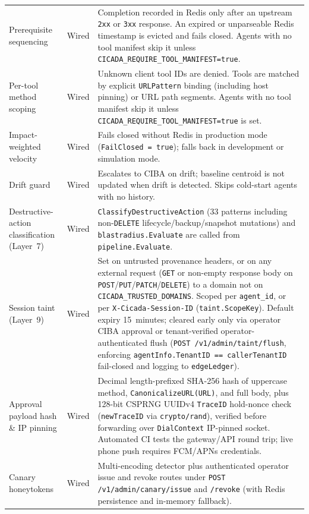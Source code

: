 \documentclass[11pt, a4paper]{article}
\begin{document}
\begin{small}
\begin{longtable}{@{} p{3.6cm} p{2.6cm} p{9.2cm} @{}}
\addlinespace
Prerequisite sequencing & Wired & Completion recorded in Redis only after an upstream \texttt{2xx} or \texttt{3xx} response. An expired or unparseable Redis timestamp is evicted and fails closed. Agents with no tool manifest skip it unless \texttt{CICADA\_REQUIRE\_TOOL\_MANIFEST=true}. \\
\addlinespace
Per-tool method scoping & Wired & Unknown client tool IDs are denied. Tools are matched by explicit \texttt{URLPattern} binding (including host pinning) or URL path segments. Agents with no tool manifest skip it unless \texttt{CICADA\_REQUIRE\_TOOL\_MANIFEST=true} is set. \\
\addlinespace
Impact-weighted velocity & Wired & Fails closed without Redis in production mode (\texttt{FailClosed = true}); falls back in development or simulation mode. \\
\addlinespace
Drift guard & Wired & Escalates to CIBA on drift; baseline centroid is not updated when drift is detected. Skips cold-start agents with no history. \\
\addlinespace
Destructive-action classification (Layer~7) & Wired & \texttt{ClassifyDestructiveAction} (33 patterns including non-\texttt{DELETE} lifecycle/backup/snapshot mutations) and \texttt{blastradius.Evaluate} are called from \texttt{pipeline.Evaluate}. \\
\addlinespace
Session taint (Layer~9) & Wired & Set on untrusted provenance headers, or on any external request (\texttt{GET} or non-empty response body on \texttt{POST}/\texttt{PUT}/\texttt{PATCH}/\texttt{DELETE}) to a domain not on \texttt{CICADA\_TRUSTED\_DOMAINS}. Scoped per \texttt{agent\_id}, or per \texttt{X-Cicada-Session-ID} (\texttt{taint.ScopeKey}). Default expiry 15~minutes; cleared early only via operator CIBA approval or tenant-verified operator-authenticated flush (\texttt{POST /v1/admin/taint/flush}, enforcing \texttt{agentInfo.TenantID == callerTenantID} fail-closed and logging to \texttt{edgeLedger}). \\
\addlinespace
Approval payload hash \& IP pinning & Wired & Decimal length-prefixed SHA-256 hash of uppercase method, \texttt{CanonicalizeURL(URL)}, and full body, plus 128-bit CSPRNG UUIDv4 \texttt{TraceID} hold-nonce check (\texttt{newTraceID} via \texttt{crypto/rand}), verified before forwarding over \texttt{DialContext} IP-pinned socket. Automated CI tests the gateway/API round trip; live phone push requires FCM/APNs credentials. \\
\addlinespace
Canary honeytokens & Wired & Multi-encoding detector plus authenticated operator issue and revoke routes under \texttt{POST /v1/admin/canary/issue} and \texttt{/revoke} (with Redis persistence and in-memory fallback). \\

\end{longtable}
\end{small}
\end{document}
